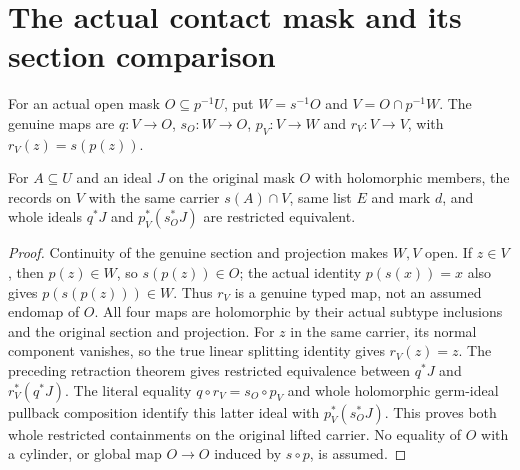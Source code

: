 \section{The actual contact mask and its section comparison}
\begin{definition}
\label{hir:actual-section-mask-overlap}
\leanok
For an actual open mask $O\subseteq p^{-1}U$, put $W=s^{-1}O$ and
$V=O\cap p^{-1}W$. The genuine maps are $q:V\to O$, $s_O:W\to O$,
$p_V:V\to W$ and $r_V:V\to V$, with $r_V(z)=s(p(z))$.
\end{definition}
\begin{lemma}
\label{hir:actual-mask-section-whole-representative}
\leanok
For $A\subseteq U$ and an ideal $J$ on the original mask $O$ with holomorphic
members, the records on $V$ with the same carrier $s(A)\cap V$, same list $E$
and mark $d$, and whole ideals $q^*J$ and $p_V^*(s_O^*J)$ are restricted equivalent.
\end{lemma}
\begin{proof}
Continuity of the genuine section and projection makes $W,V$ open.
If $z\in V$, then $p(z)\in W$, so $s(p(z))\in O$; the actual identity
$p(s(x))=x$ also gives $p(s(p(z)))\in W$. Thus $r_V$ is a genuine typed map,
not an assumed endomap of $O$. All four maps are holomorphic by their actual
subtype inclusions and the original section and projection.
For $z$ in the same carrier, its normal component vanishes, so the true linear
splitting identity gives $r_V(z)=z$. The preceding retraction theorem gives
restricted equivalence between $q^*J$ and $r_V^*(q^*J)$.
The literal equality $q\circ r_V=s_O\circ p_V$ and whole holomorphic germ-ideal
pullback composition identify this latter ideal with $p_V^*(s_O^*J)$.
This proves both whole restricted containments on the original lifted carrier.
No equality of $O$ with a cylinder, or global map $O\to O$ induced by $s\circ p$,
is assumed.
\end{proof}

